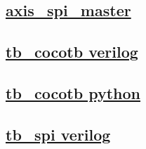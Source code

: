 \documentclass{article}
\begin{document}
  


  \subsection{\href{../files/axis_spi_master-v.html}{axis\_spi\_master}}

  \subsection{\href{../files2/tb_cocotb-v.html}{tb\_cocotb verilog}}

  \subsection{\href{../files2/tb_cocotb-py.html}{tb\_cocotb python}}

  \subsection{\href{../files2/tb_spi-v.html}{tb\_spi verilog}}
\end{document}
